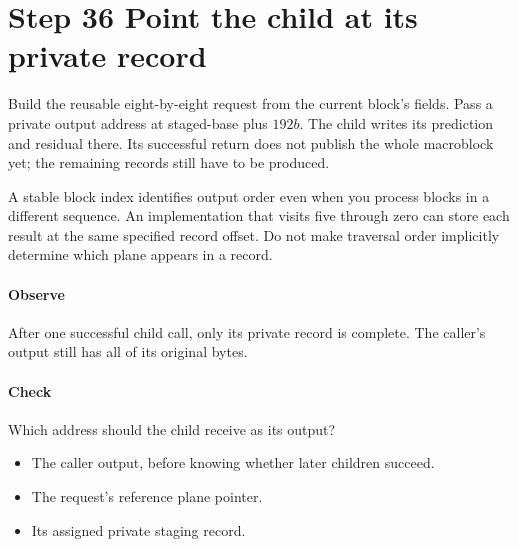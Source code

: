 \section{Step 36 Point the child at its private record}\label{h263-macroblock-s06}
Build the reusable eight-by-eight request from the current block's fields.
Pass a private output address at staged-base plus $192b$. The child writes its
prediction and residual there. Its successful return does not publish the whole
macroblock yet; the remaining records still have to be produced.

A stable block index identifies output order even when you process blocks in a
different sequence. An implementation that visits five through zero can store
each result at the same specified record offset. Do not make traversal order
implicitly determine which plane appears in a record.

\paragraph{Observe} After one successful child call, only its private record
is complete. The caller's output still has all of its original bytes.
\paragraph{Check} Which address should the child receive as its output?
\begin{itemize}
  \item[A.] The caller output, before knowing whether later children succeed.
  \item[B.] The request's reference plane pointer.
  \item[C.] Its assigned private staging record.
\end{itemize}
